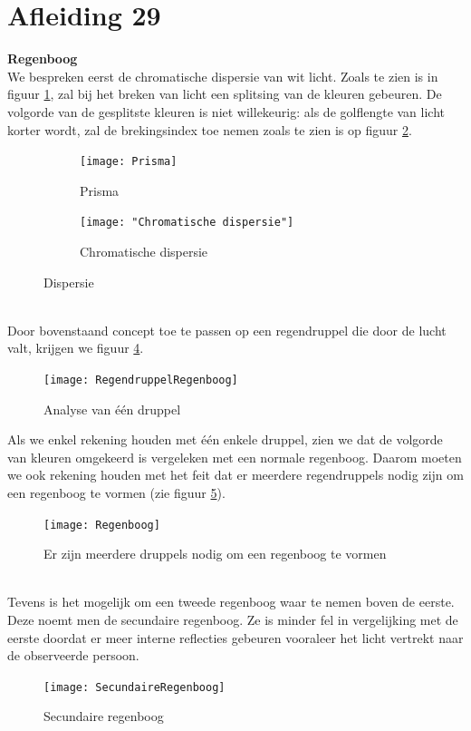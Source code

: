 \documentclass[a4paper,kul]{kulakarticle} %
\begin{document}
\section{Afleiding 29}
\textbf{Regenboog}\\
We bespreken eerst de chromatische dispersie van wit licht. Zoals te zien is in figuur \ref{fig:prisma}, zal bij het breken van licht een splitsing van de kleuren gebeuren. De volgorde van de gesplitste kleuren is niet willekeurig: als de golflengte van licht korter wordt, zal de brekingsindex toe nemen zoals te zien is op figuur \ref{fig:chromatische-dispersie}. 
\begin{figure}[!h]
	\centering
	\begin{subfigure}{.5\textwidth}
		\centering
		\texttt{[image: Prisma]}
		\caption[Prisma]{Prisma}
		\label{fig:prisma}
	\end{subfigure}%
	\begin{subfigure}{.5\textwidth}
		\centering
		\texttt{[image: "Chromatische dispersie"]}
		\caption[Chromatische dispersie]{Chromatische dispersie}
		\label{fig:chromatische-dispersie}
	\end{subfigure}
	\caption{Dispersie}
	\label{fig:ChromDisp}
\end{figure}\\
Door bovenstaand concept toe te passen op een regendruppel die door de lucht valt, krijgen we figuur \ref{fig:regendruppelregenboog}.
\begin{figure}[!h]
	\centering
	\texttt{[image: RegendruppelRegenboog]}
	\caption[Regenboog druppel]{Analyse van één druppel}
	\label{fig:regendruppelregenboog}
\end{figure}
\newpage
Als we enkel rekening houden met één enkele druppel, zien we dat de volgorde van kleuren omgekeerd is vergeleken met een normale regenboog. Daarom moeten we ook rekening houden met het feit dat er meerdere regendruppels nodig zijn om een regenboog te vormen (zie figuur \ref{fig:regenboog}).
\begin{figure}[!h]
	\centering
	\texttt{[image: Regenboog]}
	\caption[Meerdere druppels]{Er zijn meerdere druppels nodig om een regenboog te vormen}
	\label{fig:regenboog}
\end{figure}\\
Tevens is het mogelijk om een tweede regenboog waar te nemen boven de eerste. Deze noemt men de secundaire regenboog. Ze is minder fel in vergelijking met de eerste doordat er meer interne reflecties gebeuren vooraleer het licht vertrekt naar de observeerde persoon.
\begin{figure}[!h]
	\centering
	\texttt{[image: SecundaireRegenboog]}
	\caption[Secundaire regenboog]{Secundaire regenboog}
	\label{fig:secundaireregenboog}
\end{figure}
\end{document}
